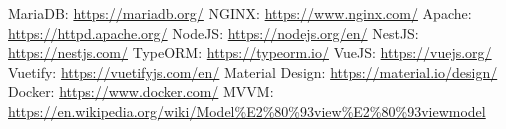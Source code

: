 \newpage
\begin{thebibliography}{9}
    MariaDB: \url{https://mariadb.org/}
    NGINX: \url{https://www.nginx.com/}
    Apache: \url{https://httpd.apache.org/}
    NodeJS: \url{https://nodejs.org/en/}
    NestJS: \url{https://nestjs.com/}
    TypeORM: \url{https://typeorm.io/}
    VueJS: \url{https://vuejs.org/}
    Vuetify: \url{https://vuetifyjs.com/en/}
    Material Design: \url{https://material.io/design/}
    Docker: \url{https://www.docker.com/}
    MVVM: \url{https://en.wikipedia.org/wiki/Model%E2%80%93view%E2%80%93viewmodel}
\end{thebibliography}